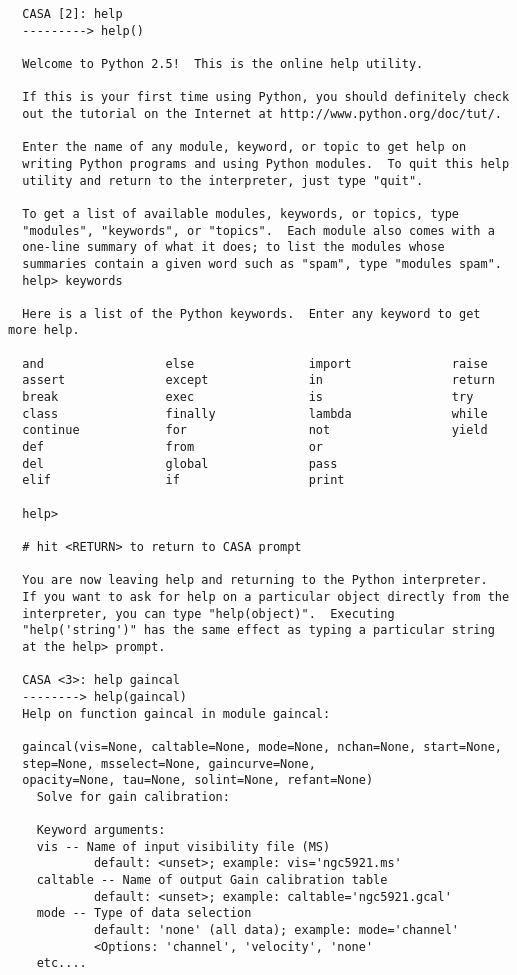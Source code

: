 \small
\begin{verbatim}
  CASA [2]: help
  ---------> help()

  Welcome to Python 2.5!  This is the online help utility.

  If this is your first time using Python, you should definitely check
  out the tutorial on the Internet at http://www.python.org/doc/tut/.

  Enter the name of any module, keyword, or topic to get help on
  writing Python programs and using Python modules.  To quit this help
  utility and return to the interpreter, just type "quit".

  To get a list of available modules, keywords, or topics, type
  "modules", "keywords", or "topics".  Each module also comes with a
  one-line summary of what it does; to list the modules whose
  summaries contain a given word such as "spam", type "modules spam".
  help> keywords

  Here is a list of the Python keywords.  Enter any keyword to get more help.

  and                 else                import              raise
  assert              except              in                  return
  break               exec                is                  try
  class               finally             lambda              while
  continue            for                 not                 yield
  def                 from                or
  del                 global              pass
  elif                if                  print

  help>

  # hit <RETURN> to return to CASA prompt

  You are now leaving help and returning to the Python interpreter.
  If you want to ask for help on a particular object directly from the
  interpreter, you can type "help(object)".  Executing
  "help('string')" has the same effect as typing a particular string
  at the help> prompt.

  CASA <3>: help gaincal
  --------> help(gaincal)
  Help on function gaincal in module gaincal:

  gaincal(vis=None, caltable=None, mode=None, nchan=None, start=None,
  step=None, msselect=None, gaincurve=None,  
  opacity=None, tau=None, solint=None, refant=None)
    Solve for gain calibration:
    
    Keyword arguments:
    vis -- Name of input visibility file (MS)
            default: <unset>; example: vis='ngc5921.ms'
    caltable -- Name of output Gain calibration table
            default: <unset>; example: caltable='ngc5921.gcal'
    mode -- Type of data selection
            default: 'none' (all data); example: mode='channel'
            <Options: 'channel', 'velocity', 'none'
    etc....
\end{verbatim}
\normalsize

